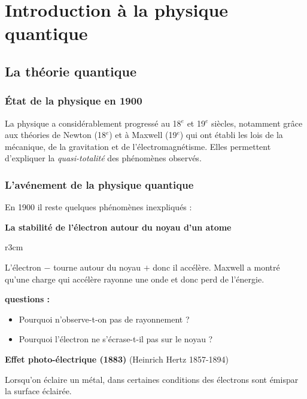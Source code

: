 \documentclass[MPSI]{cours}
\begin{document}
\setcounter{chapter}{27}
\chapter{Introduction à la physique quantique}
\section{La théorie quantique}
\subsection{\'Etat de la physique en 1900}
La physique a considérablement progressé au 18$^e$ et 19$^{e}$ siècles, notamment grâce aux théories de Newton (18$^{e}$) et à Maxwell (19$^e$) qui ont établi les lois de la mécanique, de la gravitation et de l'électromagnétisme. Elles permettent d'expliquer la \emph{quasi-totalité} des phénomènes observés.

\subsection{L'avénement de la physique quantique}
En 1900 il reste quelques phénomènes inexpliqués :

\vspace{1em}
\textbf{La stabilité de l'électron autour du noyau d'un atome} \\
\begin{wrapfigure}{r}{3cm}
\end{wrapfigure}
L'électron $-$ tourne autour du noyau $+$ donc il accélère. Maxwell a montré qu'une charge qui accélère rayonne une onde et donc perd de l'énergie.

\textbf{questions :}
\begin{itemize}
\item Pourquoi n'observe-t-on pas de rayonnement ?
\item Pourquoi l'électron ne s'écrase-t-il pas sur le noyau ?
\end{itemize} 

\vspace{2em}
\textbf{Effet photo-électrique (1883)} (Heinrich Hertz 1857-1894)

\begin{center}
\end{center}
Lorsqu'on éclaire un métal, dans certaines conditions des électrons sont émispar la surface éclairée.
\end{document}
